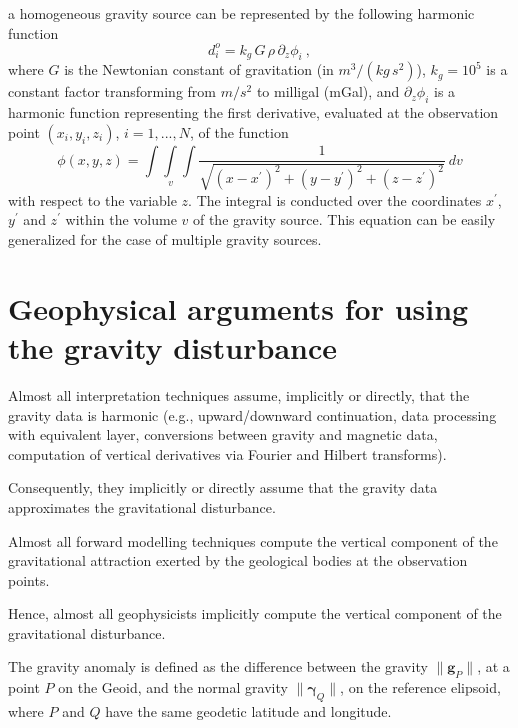 \documentclass[manuscript]{geophysics}
\begin{document}
a homogeneous gravity source can be represented 
by the following harmonic function
\begin{equation}
d^{o}_{i} = k_{g} \, G \, \rho \, \partial_{z} \phi_{i} \: ,
\label{eq:gz-local}
\end{equation}
where $G$ is the Newtonian constant of gravitation
(in $m^{3} / (kg \, s^{2})$),
$k_{g} = 10^{5}$ is a constant factor
transforming from $m/s^{2}$ to milligal (mGal),
and $\partial_{z} \phi_{i}$ is a harmonic function representing the first 
derivative, evaluated at the observation point $(x_{i},y_{i},z_{i})$, 
$i = 1, ..., N$, of the function 
\begin{equation}
\phi(x,y,z) = \int\int\limits_{v}\int \frac{1}{\sqrt{(x - x^{\prime})^{2} + 
(y - y^{\prime})^{2} + (z - z^{\prime})^{2}}} \: dv
\label{eq:phi}
\end{equation}
with respect to the variable $z$. The 
integral is conducted over the coordinates $x^{\prime}$, $y^{\prime}$ 
and $z^{\prime}$ within the volume $v$ of the gravity source.
This equation can be easily generalized for the case
of multiple gravity sources.

\section{Geophysical arguments for using the gravity disturbance}

Almost all interpretation techniques assume, implicitly or
directly, that the gravity data is harmonic (e.g., 
upward/downward continuation, 
data processing with equivalent layer,
conversions between gravity and magnetic data,
computation of vertical derivatives via Fourier and Hilbert
transforms).


Consequently, they implicitly or directly assume that
the gravity data approximates the gravitational disturbance.


Almost all forward modelling techniques compute
the vertical component of the gravitational attraction 
exerted by the geological bodies at the observation points.


Hence, almost all geophysicists implicitly compute 
the vertical component of the gravitational disturbance.


The gravity anomaly is defined as the difference between 
the gravity $\| \mathbf{g}_{P} \|$, at a point $P$ on the
Geoid, and the normal gravity $\| \boldsymbol{\gamma}_{Q} \|$,
on the reference elipsoid, where $P$ and $Q$ have the same
geodetic latitude and longitude.
\end{document}
